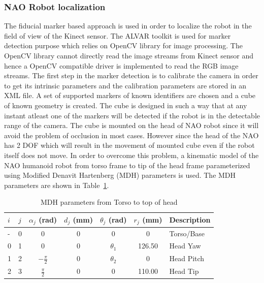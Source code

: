 \subsubsection{NAO Robot localization}
The fiducial marker based approach is used in order to localize the robot in the field of view of the Kinect sensor. The ALVAR \cite{ALVAR} toolkit is used for marker detection purpose which relies on OpenCV library for image processing. The OpenCV library cannot directly read the image streams from Kinect sensor and hence a OpenCV compatible driver is implemented to read the RGB image streams. The first step in the marker detection is to calibrate the camera in order to get its intrinsic parameters and the calibration parameters are stored in an XML file. A set of supported markers of known identifiers are chosen and a cube of known geometry is created. The cube is designed in such a way that at any instant atleast one of the markers will be detected if the robot is in the detectable range of the camera. The cube is mounted on the head of NAO robot since it will avoid the problem of occlusion in most cases. However since the head of the NAO has 2 DOF which will result in the movement of mounted cube even if the robot itself does not move. In order to overcome this problem, a kinematic model of the NAO humanoid robot from torso frame to tip of the head frame parameterized using Modified Denavit Hartenberg (MDH) \cite{khalil2004modeling} parameters is used. The MDH parameters are shown in Table~\ref{table:nao_mdh}.
\begin{table}[H]
\centering
\small
\caption{MDH parameters from Torso to top of head}
\label{table:nao_mdh}
\begin{tabular}{|l|l|c|c|c|c|p{2cm}|}
\hline
  \textbf{$i$}  & \textbf{$j$}  & \textbf{$\alpha_j$ (rad)} & \textbf{$d_j$ (mm)} & \textbf{$\theta_j$ (rad)} & \textbf{$r_j$ (mm)} & \textbf{Description}
  \tabularnewline \hline
  - & 0 & 0 & 0 & 0 & 0 & Torso/Base
                                          \tabularnewline\hline
                                          
  0 & 1 & 0 & 0 & $\theta_1$ & 126.50 & Head Yaw
                                          \tabularnewline\hline
                       
  1 & 2 & $-\frac{\pi}{2}$ & 0 & $\theta_2$ & 0 & Head Pitch
                                          \tabularnewline\hline                    
  
  2 & 3 & $\frac{\pi}{2}$ & 0 & 0 & 110.00 & Head Tip
                                          \tabularnewline\hline
\end{tabular}
\end{table}

